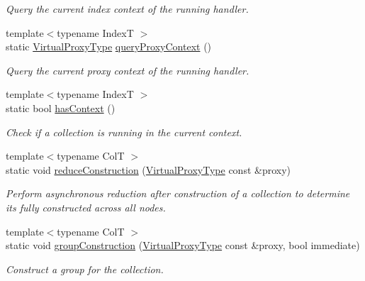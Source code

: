\begin{DoxyCompactItemize}
\begin{DoxyCompactList}\small\item\em Query the current index context of the running handler. \end{DoxyCompactList}\item 
{\footnotesize template$<$typename IndexT $>$ }\\static \hyperlink{namespacevt_a1b417dd5d684f045bb58a0ede70045ac}{Virtual\+Proxy\+Type} \hyperlink{structvt_1_1vrt_1_1collection_1_1_collection_manager_a77d8832834659c44badf499c4770777b}{query\+Proxy\+Context} ()
\begin{DoxyCompactList}\small\item\em Query the current proxy context of the running handler. \end{DoxyCompactList}\item 
{\footnotesize template$<$typename IndexT $>$ }\\static bool \hyperlink{structvt_1_1vrt_1_1collection_1_1_collection_manager_ad94808d98e429e50376a9d1b35de57ee}{has\+Context} ()
\begin{DoxyCompactList}\small\item\em Check if a collection is running in the current context. \end{DoxyCompactList}\item 
{\footnotesize template$<$typename ColT $>$ }\\static void \hyperlink{structvt_1_1vrt_1_1collection_1_1_collection_manager_a387f6106adb3d0accd039ee4ff50a515}{reduce\+Construction} (\hyperlink{namespacevt_a1b417dd5d684f045bb58a0ede70045ac}{Virtual\+Proxy\+Type} const \&proxy)
\begin{DoxyCompactList}\small\item\em Perform asynchronous reduction after construction of a collection to determine it\textquotesingle{}s fully constructed across all nodes. \end{DoxyCompactList}\item 
{\footnotesize template$<$typename ColT $>$ }\\static void \hyperlink{structvt_1_1vrt_1_1collection_1_1_collection_manager_a3512b8e7d8bac218f28e7ffef611e5fa}{group\+Construction} (\hyperlink{namespacevt_a1b417dd5d684f045bb58a0ede70045ac}{Virtual\+Proxy\+Type} const \&proxy, bool immediate)
\begin{DoxyCompactList}\small\item\em Construct a group for the collection. \end{DoxyCompactList}\item 

\end{DoxyCompactItemize}
